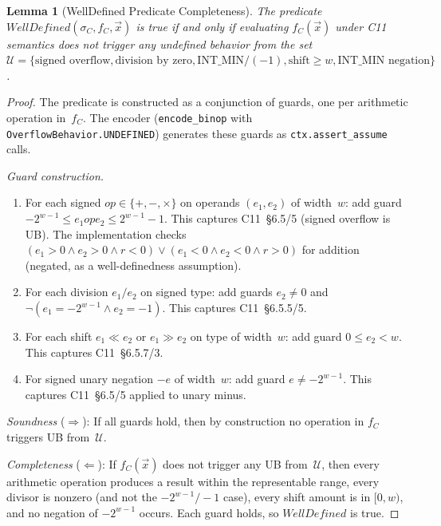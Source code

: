 \documentclass[10pt,a4paper]{article}
\newtheorem{lemma}[theorem]{Lemma}
\begin{document}
\begin{appendices}
\begin{lemma}[WellDefined Predicate Completeness]\label{lem:wd-complete}
The predicate $\mathit{WellDefined}(\sigma_C, f_C, \vec{x})$ is true
if and only if evaluating $f_C(\vec{x})$ under C11 semantics does not
trigger any undefined behavior from the set
$\mathcal{U} = \{\text{signed overflow}, \text{division by zero},
\text{INT\_MIN}/(-1), \text{shift} \geq w,
\text{INT\_MIN negation}\}$.
\end{lemma}

\begin{proof}
The predicate is constructed as a conjunction of guards, one per
arithmetic operation in~$f_C$.  The encoder
(\texttt{encode\_binop} with \texttt{OverflowBehavior.UNDEFINED})
generates these guards as \texttt{ctx.assert\_assume} calls.

\emph{Guard construction.}
\begin{enumerate}
  \item For each signed $op \in \{+, -, \times\}$ on operands
    $(e_1, e_2)$ of width~$w$: add guard
    $-2^{w-1} \leq e_1 \mathbin{op} e_2 \leq 2^{w-1}-1$.
    This captures C11~\S6.5/5 (signed overflow is UB).
    The implementation checks
    $(e_1 > 0 \wedge e_2 > 0 \wedge r < 0)
    \vee (e_1 < 0 \wedge e_2 < 0 \wedge r > 0)$
    for addition (negated, as a well-definedness assumption).

  \item For each division $e_1 / e_2$ on signed type: add guards
    $e_2 \neq 0$ and $\neg(e_1 = -2^{w-1} \wedge e_2 = -1)$.
    This captures C11~\S6.5.5/5.

  \item For each shift $e_1 \mathbin{\ll} e_2$ or
    $e_1 \mathbin{\gg} e_2$ on type of width~$w$: add guard
    $0 \leq e_2 < w$.  This captures C11~\S6.5.7/3.

  \item For signed unary negation $-e$ of width~$w$: add guard
    $e \neq -2^{w-1}$.  This captures C11~\S6.5/5 applied to
    unary minus.
\end{enumerate}

\emph{Soundness} ($\Rightarrow$): If all guards hold, then by
construction no operation in $f_C$ triggers UB from~$\mathcal{U}$.

\emph{Completeness} ($\Leftarrow$): If $f_C(\vec{x})$ does not
trigger any UB from~$\mathcal{U}$, then every arithmetic operation
produces a result within the representable range, every divisor is
nonzero (and not the $-2^{w-1}/-1$ case), every shift amount is
in $[0,w)$, and no negation of $-2^{w-1}$ occurs.  Each guard holds,
so $\mathit{WellDefined}$ is true.


\end{proof}
\end{appendices}
\end{document}
